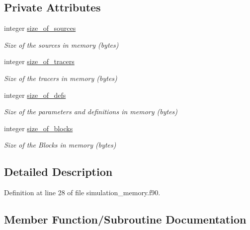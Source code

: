 \subsection*{Private Attributes}
\begin{DoxyCompactItemize}
\item 
integer \mbox{\hyperlink{structsimulation__memory__mod_1_1memory__t_a3e461b40b58c78011285068a2afaf2b8}{size\+\_\+of\+\_\+sources}}
\begin{DoxyCompactList}\small\item\em Size of the sources in memory (bytes) \end{DoxyCompactList}\item 
integer \mbox{\hyperlink{structsimulation__memory__mod_1_1memory__t_a7b1960036177b6612be260699fcdb19a}{size\+\_\+of\+\_\+tracers}}
\begin{DoxyCompactList}\small\item\em Size of the tracers in memory (bytes) \end{DoxyCompactList}\item 
integer \mbox{\hyperlink{structsimulation__memory__mod_1_1memory__t_a14c7c2387ac9b23e6f3b5b4ab0433e50}{size\+\_\+of\+\_\+defs}}
\begin{DoxyCompactList}\small\item\em Size of the parameters and definitions in memory (bytes) \end{DoxyCompactList}\item 
integer \mbox{\hyperlink{structsimulation__memory__mod_1_1memory__t_aa0426bef9384f95d4317ca5b03b63428}{size\+\_\+of\+\_\+blocks}}
\begin{DoxyCompactList}\small\item\em Size of the Blocks in memory (bytes) \end{DoxyCompactList}\end{DoxyCompactItemize}


\subsection{Detailed Description}


Definition at line 28 of file simulation\+\_\+memory.\+f90.



\subsection{Member Function/\+Subroutine Documentation}
\mbox{\label{structsimulation__memory__mod_1_1memory__t_a374c166c7b2412805d1c4e513bdba93b}} 
